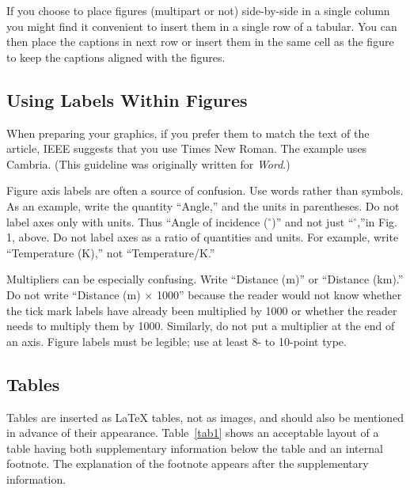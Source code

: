 \documentclass{IEEEtran}
\begin{document}
If you choose to place figures (multipart or not) side-by-side in a single
column you might find it convenient to insert them in a single row of a
tabular. You can then place the captions in next row or insert them in the
same cell as the figure to keep the captions aligned with the figures.

\subsection{Using Labels Within Figures}
When preparing your graphics, if you prefer them to match the text of
the article, IEEE suggests that you use Times New Roman. The example
uses Cambria. (This guideline was originally written for \emph{Word}.)

Figure axis labels are often a source of confusion. Use words rather than
symbols. As an example, write the quantity ``Angle,'' and the units in
parentheses. Do not label axes only with units. Thus ``Angle of incidence
($^{\circ}$)'' and not just ``$^{\circ}$,''in Fig. 1, above. Do not
label axes as a ratio of quantities and units. For example, write
``Temperature (K),'' not ``Temperature/K.''

Multipliers can be especially confusing. Write ``Distance (m)'' or
``Distance (km).'' Do not write ``Distance (m) $\times$ 1000'' because the
reader would not know whether the tick mark labels have already been
multiplied by 1000 or whether the reader needs to multiply them by 1000.
Similarly, do not put a multiplier at the end of an axis. Figure labels must
be legible; use at least 8- to 10-point type.

\subsection{Tables}
Tables are inserted as {\LaTeX} tables, not as images, and should also be mentioned
in advance of their appearance. Table~\ref{tab1} shows an
acceptable layout of a table having both supplementary information below the
table and an internal footnote. The explanation of the footnote appears
after the supplementary information.
\end{document}
